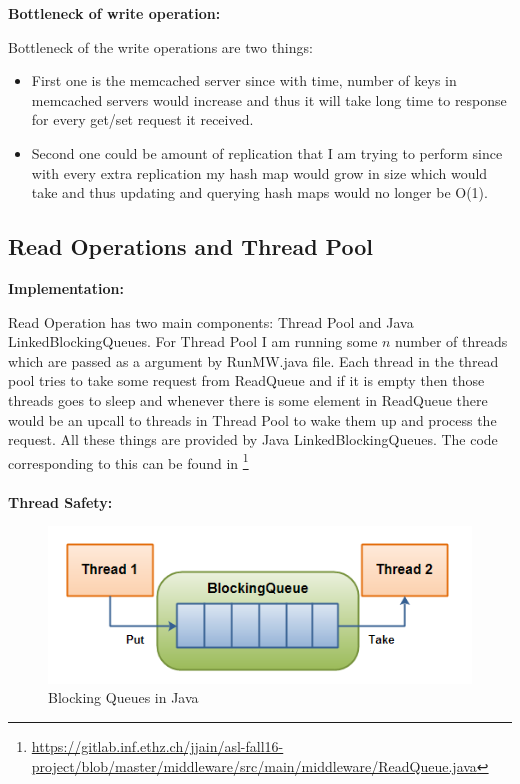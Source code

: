 \documentclass[11pt]{article}
\begin{document}
\textbf{Bottleneck of write operation:}

Bottleneck of the write operations are two things:
\begin{itemize}
	\item First one is the memcached server since with time, number of keys in memcached servers would increase and thus it will take long time to response for every get/set request it received.
	\item Second one could be amount of replication that I am trying to perform since with every extra replication my hash map would grow in size which would take and thus updating and querying hash maps would no longer be O(1). 
\end{itemize}

\subsection{Read Operations and Thread Pool}\label{sec:desc:reads}

\textbf{Implementation:}

Read Operation has two main components: Thread Pool and Java LinkedBlockingQueues. For Thread Pool I am running some $n$ number of threads which are passed as a argument by RunMW.java file. Each thread in the thread pool tries to take some request from ReadQueue and if it is empty then those threads goes to sleep and whenever there is some element in ReadQueue there would be an upcall to threads in Thread Pool to wake them up and process the request. All these things are provided by Java LinkedBlockingQueues. The code corresponding to this can be found in \footnote{\url{https://gitlab.inf.ethz.ch/jjain/asl-fall16-project/blob/master/middleware/src/main/middleware/ReadQueue.java}}
\\ \\
\textbf{Thread Safety:}

\begin{figure}[h]
    \centering
    \includegraphics[scale=0.6]{blocking}
    \caption{Blocking Queues in Java}
    \label{fig:hash}
\end{figure}
\end{document}
